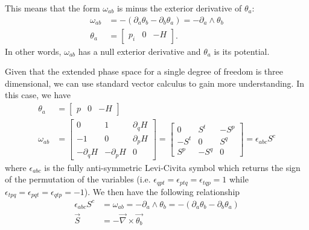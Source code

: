 This means that the form $\omega_{ab}$ is minus the exterior derivative of $\theta_a$:
\begin{equation}\label{rp-cm-formPotential}
	\begin{aligned}
	\omega_{ab} &= - (\partial_a \theta_b - \partial_b \theta_a) = - \partial_a \wedge \theta_b \\
\theta_a &= \begin{bmatrix}
	p_i & 0 & - H
\end{bmatrix}.
	\end{aligned}
\end{equation}
In other words, $\omega_{ab}$ has a null exterior derivative and $\theta_a$ is its potential.

Given that the extended phase space for a single degree of freedom is three dimensional, we can use standard vector calculus to gain more understanding. In this case, we have
\begin{equation}
	\begin{aligned}
	\theta_a &= \begin{bmatrix}
		p & 0 & - H
	\end{bmatrix} \\
\omega_{ab} &= \left[\begin{array}{ccc}
	0 & 1 & \partial_{q} H \\
	- 1 & 0 & \partial_{p} H \\
	- \partial_{q} H & -\partial_{p} H & 0
\end{array} \right]
= \left[\begin{array}{ccc}
	0 & S^t & - S^p \\
	- S^t & 0 & S^q \\
	S^p & - S^q & 0
\end{array} \right] = \epsilon_{abc}S^c
	\end{aligned}
\end{equation}
where $\epsilon_{abc}$ is the fully anti-symmetric Levi-Civita symbol which returns the sign of the permutation of the variables (i.e. $\epsilon_{qpt} = \epsilon_{ptq} = \epsilon_{tqp} = 1$ while $\epsilon_{tpq} = \epsilon_{pqt} = \epsilon_{qtp} = -1$). We then have the following relationship
\begin{equation}\label{rp-cm-displacementFormComponents}
	\begin{aligned}
	\epsilon_{abc}S^c &= \omega_{ab} = - \partial_a \wedge \theta_b = - (\partial_a \theta_b - \partial_b \theta_a) \\
	\vec{S} &= - \vec{\nabla} \times \vec{\theta_b} \\
	\end{aligned}
\end{equation}
